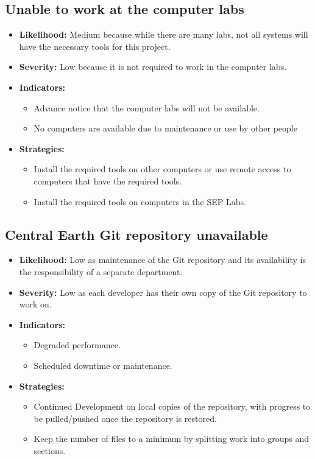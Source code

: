 \documentclass{article}
\begin{document}
\subsection{Unable to work at the computer labs}
\begin{itemize}
	\item \textbf{Likelihood:} Medium because while there are many labs, not all systems will have the necessary tools for this project.
	\item \textbf{Severity:} Low because it is not required to work in the computer labs.
	\item \textbf{Indicators:} 
		\begin{itemize}
			\item Advance notice that the computer labs will not be available.
			\item No computers are available due to maintenance or use by other people
		\end{itemize}
	\item \textbf{Strategies:} 
		\begin{itemize}
			\item Install the required tools on other computers or use remote access to computers that have the required tools.
			\item Install the required tools on computers in the SEP Labs.
		\end{itemize}
\end{itemize}

\subsection{Central Earth Git repository unavailable}
\begin{itemize}
	\item \textbf{Likelihood:} Low as maintenance of the Git repository and its availability is the responsibility of a separate department.
	\item \textbf{Severity:} Low as each developer has their own copy of the Git repository to work on.
	\item \textbf{Indicators:} 
		\begin{itemize}
			\item Degraded performance.
			\item Scheduled downtime or maintenance.
		\end{itemize}
	\item \textbf{Strategies:} 
		\begin{itemize}
			\item Continued Development on local copies of the repository, with progress to be pulled/pushed once the repository is restored.
			\item Keep the number of files to a minimum by splitting work into groups and sections.
		\end{itemize}
\end{itemize}
\end{document}
